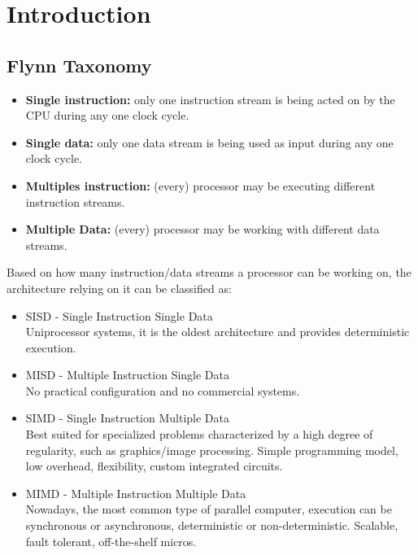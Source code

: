 
\section{Introduction}\label{sec:introduction}

\subsection{Flynn Taxonomy}\label{subsec:flynn-taxonomy}

\begin{itemize}
    \item[] \textbf{Single instruction:} only one instruction stream is being acted on by the CPU during any one clock
    cycle.
    \item[] \textbf{Single data:} only one data stream is being used as input during any one clock cycle.
    \item[] \textbf{Multiples instruction:} (every) processor may be executing different instruction streams.
    \item[] \textbf{Multiple Data:} (every) processor may be working with different data streams.
\end{itemize}

Based on how many instruction/data streams a processor can be working on, the architecture relying on it can be
classified as:

\begin{itemize}
    \item SISD - Single Instruction Single Data\\
    Uniprocessor systems, it is the oldest architecture and provides deterministic execution.
    \item MISD - Multiple Instruction Single Data\\
    No practical configuration and no commercial systems.
    \item SIMD - Single Instruction Multiple Data\\
    Best suited for specialized problems characterized by a high degree of regularity, such as graphics/image
    processing.
    Simple programming model, low overhead, flexibility, custom integrated circuits.
    \item MIMD - Multiple Instruction Multiple Data\\
    Nowadays, the most common type of parallel computer, execution can be synchronous or asynchronous,
    deterministic or non-deterministic.
    Scalable, fault tolerant, off-the-shelf micros.
\end{itemize}

